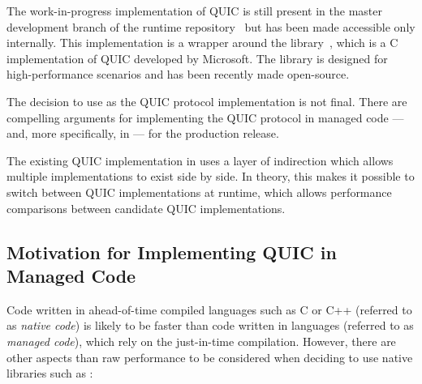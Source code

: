 The work-in-progress implementation of QUIC is still present in the master development branch of the
\dotnet{} runtime repository~\cite{dotnetGithub} but has been made accessible only internally. This
implementation is a wrapper around the \libmsquic{} library~\cite{msquicGithub}, which is a C
implementation of QUIC developed by Microsoft. The \libmsquic{} library is designed for
high-performance scenarios and has been recently made open-source.

The decision to use \libmsquic{} as the QUIC protocol implementation is not final. There are
compelling arguments for implementing the QUIC protocol in managed \dotnet{} code --- and, more
specifically, in \csharp{} --- for the production release.

The existing QUIC implementation in \dotnet{} uses a layer of indirection which allows multiple
implementations to exist side by side. In theory, this makes it possible to switch between QUIC
implementations at runtime, which allows performance comparisons between candidate QUIC
implementations.

\subsection*{Motivation for Implementing QUIC in Managed Code}

Code written in ahead-of-time compiled languages such as C or C++ (referred to as \textit{native
code}) is likely to be faster than code written in \dotnet{} languages (referred to as
\textit{managed code}), which rely on the just-in-time compilation. However, there are other aspects
than raw performance to be considered when deciding to use native libraries such as \libmsquic{}:

